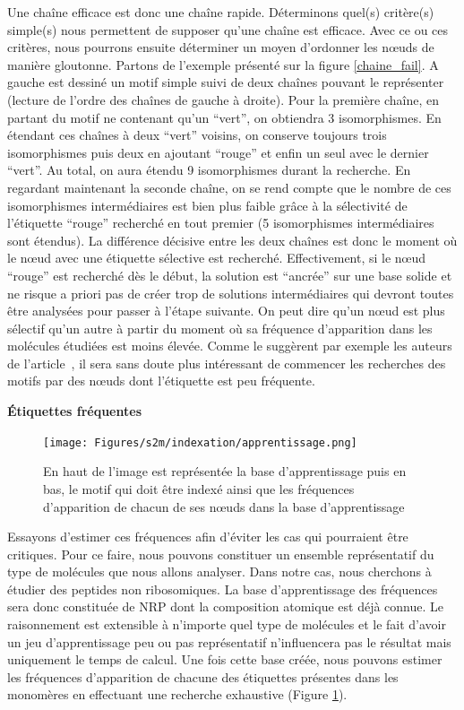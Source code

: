Une chaîne efficace est donc une chaîne rapide.
Déterminons quel(s) critère(s) simple(s) nous permettent de supposer qu'une chaîne est efficace.
Avec ce ou ces critères, nous pourrons ensuite déterminer un moyen d'ordonner les n\oe{}uds de manière gloutonne.
Partons de l'exemple présenté sur la figure \ref{chaine_fail}.
A gauche est dessiné un motif simple suivi de deux chaînes pouvant le représenter (lecture de l'ordre des chaînes de gauche à droite).
Pour la première chaîne, en partant du motif ne contenant qu'un ``vert'', on obtiendra 3 isomorphismes.
En étendant ces chaînes à deux ``vert'' voisins, on conserve toujours trois isomorphismes puis deux en ajoutant ``rouge'' et enfin un seul avec le dernier ``vert''.
Au total, on aura étendu 9 isomorphismes durant la recherche.
En regardant maintenant la seconde chaîne, on se rend compte que le nombre de ces isomorphismes intermédiaires est bien plus faible grâce à la sélectivité de l'étiquette ``rouge'' recherché en tout premier (5 isomorphismes intermédiaires sont étendus).
La différence décisive entre les deux chaînes est donc le moment où le n\oe{}ud avec une étiquette sélective est recherché.
Effectivement, si le n\oe{}ud ``rouge'' est recherché dès le début, la solution est ``ancrée'' sur une base solide et ne risque a priori pas de créer trop de solutions intermédiaires qui devront toutes être analysées pour passer à l'étape suivante.
On peut dire qu'un n\oe{}ud est plus sélectif qu'un autre à partir du moment où sa fréquence d'apparition dans les molécules étudiées est moins élevée.
Comme le suggèrent par exemple les auteurs de l'article~\cite{lacroix_motif_2006}, il sera sans doute plus intéressant de commencer les recherches des motifs par des n\oe{}uds dont l'étiquette est peu fréquente.

\textbf{Étiquettes fréquentes}

\begin{figure}[!ht]
  \begin{center}
    \texttt{[image: Figures/s2m/indexation/apprentissage.png]}
    \caption{\label{apprentissage}En haut de l'image est représentée la base d'apprentissage puis en bas, le motif qui doit être indexé ainsi que les fréquences d'apparition de chacun de ses n\oe{}uds dans la base d'apprentissage}
  \end{center}
\end{figure}

Essayons d'estimer ces fréquences afin d'éviter les cas qui pourraient être critiques.
Pour ce faire, nous pouvons constituer un ensemble représentatif du type de molécules que nous allons analyser.
Dans notre cas, nous cherchons à étudier des peptides non ribosomiques.
La base d'apprentissage des fréquences sera donc constituée de NRP dont la composition atomique est déjà connue.
Le raisonnement est extensible à n'importe quel type de molécules et le fait d'avoir un jeu d'apprentissage peu ou pas représentatif n'influencera pas le résultat mais uniquement le temps de calcul.
Une fois cette base créée, nous pouvons estimer les fréquences d'apparition de chacune des étiquettes présentes dans les monomères en effectuant une recherche exhaustive (Figure \ref{apprentissage}).

